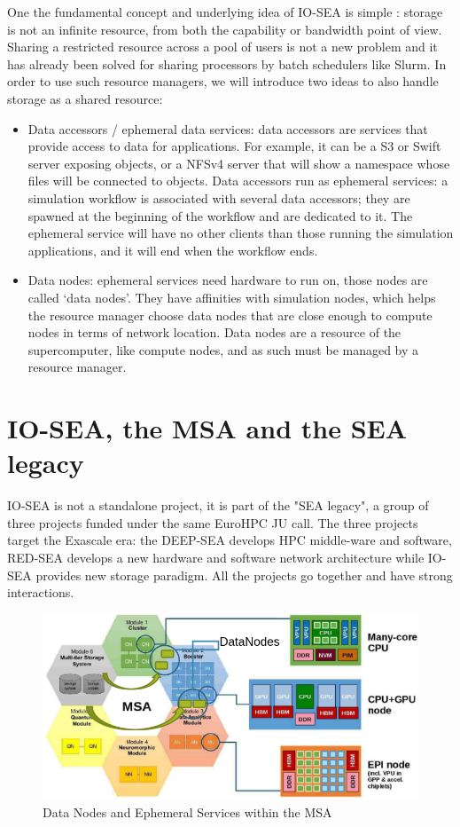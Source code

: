 One the fundamental concept and underlying idea of IO-SEA is simple : storage is not an infinite resource, 
from both the capability or bandwidth point of view.   Sharing a restricted resource across a pool of users is
not a new problem and it has already been solved for sharing processors by batch schedulers like Slurm. In order
to use such resource managers, we will introduce two ideas to also handle storage as a shared resource:
\begin{itemize}
    \item Data accessors / ephemeral data services: data accessors are services that provide access to data for applications. For example, it can be a S3 or Swift server exposing objects, or a NFSv4 server that will show a namespace whose files will be connected to objects. Data accessors run as ephemeral services: a simulation workflow is associated with several data accessors; they are spawned at the beginning of the workflow and are dedicated to it. The ephemeral service will have no other clients than those running the simulation applications, and it will end when the workflow ends.
    
    \item Data nodes: ephemeral services need hardware to run on, those nodes are called ‘data nodes’. They have affinities with simulation nodes, which helps the resource manager choose data nodes that are close enough to compute nodes in terms of network location. Data nodes are a resource of the supercomputer, like compute nodes, and as such must be managed by a resource manager.
\end{itemize}

\section{IO-SEA, the MSA and the SEA legacy}

IO-SEA is not a standalone project, it is part of the "SEA legacy", a group of three projects funded under the
same EuroHPC JU call. The three projects target the Exascale era: the DEEP-SEA develops HPC middle-ware and
software, RED-SEA develops a new hardware and software network architecture while IO-SEA provides new storage
paradigm. All the projects go together and have strong interactions.

\begin{figure}[ht]
    \centering
    \includegraphics[width=\textwidth]{FIGS/MSA.png}
    \caption[The Modular Supercomputer Architecture]{ Data Nodes and Ephemeral Services within the MSA}
    \label{fig:msa}
\end{figure}

